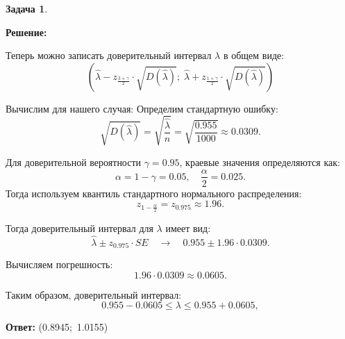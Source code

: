 \documentclass[a4paper,11pt]{article}
\newenvironment{shdd}{\begin{mdframed}[backgroundcolor=shadecolor]}{\end{mdframed}}
\theoremstyle{definition}
\newtheorem{problem}{Задача}\setlength{\parindent}{0pt}
\newenvironment{solution}
{\begin{shdd}\textbf{Решение:}\par\setlength{\parindent}{0pt}}
{\end{shdd}}
\newenvironment{answer}
{\par\noindent\textbf{Ответ:}}
{\par}
\begin{document}
\begin{problem}
\begin{solution}
            Теперь можно записать доверительный интервал \(\lambda\) в общем виде:
            \[
            (\hat{\lambda} - z_{\frac{3 + \gamma}{2}} \cdot \sqrt{D(\hat{\lambda})}; \; \hat{\lambda} + z_{\frac{1+\gamma}{2}} \cdot \sqrt{D(\hat{\lambda})})
            \]

            Вычислим для нашего случая: 
            Определим стандартную ошибку:
            \[
            \sqrt{D(\hat{\lambda})} = \sqrt{\frac{\hat{\lambda}}{n}} = \sqrt{\frac{0.955}{1000}} \approx 0.0309.
            \]
            
            Для доверительной вероятности \(\gamma = 0.95\), краевые значения определяются как:
            \[
            \alpha = 1 - \gamma = 0.05,\quad \frac{\alpha}{2} = 0.025.
            \]
            Тогда используем квантиль стандартного нормального распределения:
            \[
            z_{1 - \frac{\alpha}{2}} = z_{0.975} \approx 1.96.
            \]
            
            Тогда доверительный интервал для \(\lambda\) имеет вид:
            \[
            \hat{\lambda} \pm z_{0.975} \cdot SE \quad \rightarrow \quad 0.955 \pm 1.96 \cdot 0.0309.
            \]
            
            Вычисляем погрешность:
            \[
            1.96 \cdot 0.0309 \approx 0.0605.
            \]
            
            Таким образом, доверительный интервал:
            \[
            0.955 - 0.0605 \leq \lambda \leq 0.955 + 0.0605,
            \]
            
    \end{solution}

    \begin{answer}
        (0.8945;\, 1.0155)
    \end{answer}

\end{problem}
\end{document}

